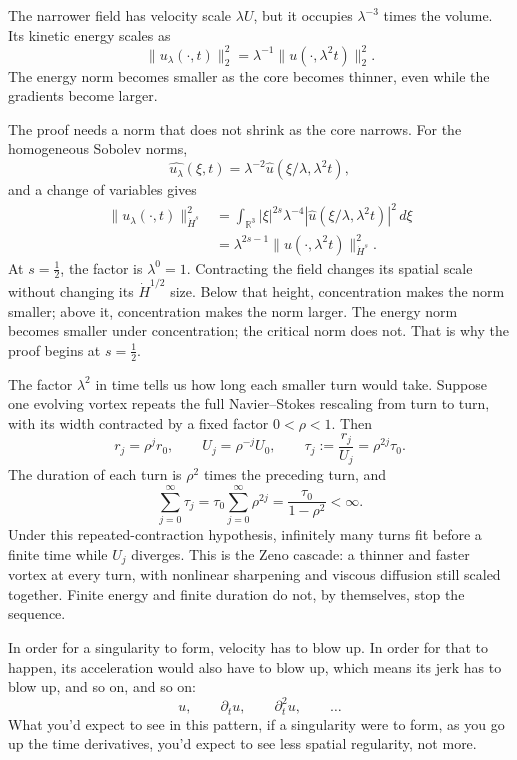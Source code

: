The narrower field has velocity scale \(\lambda U\), but it occupies
\(\lambda^{-3}\) times the volume. Its kinetic energy scales as
\[
\|u_\lambda(\cdot,t)\|_2^2
=\lambda^{-1}\|u(\cdot,\lambda^2t)\|_2^2.
\]
The energy norm becomes smaller as the core becomes thinner, even while the
gradients become larger.

\begin{minipage}{\textwidth}
The proof needs a norm that does not shrink as the core narrows. For the
homogeneous Sobolev norms,
\[
\widehat{u_\lambda}(\xi,t)
=\lambda^{-2}\widehat u(\xi/\lambda,\lambda^2t),
\]
and a change of variables gives
\[
\begin{aligned}
\|u_\lambda(\cdot,t)\|_{\dot H^s}^2
&=\int_{\mathbb R^3}|\xi|^{2s}\lambda^{-4}
  |\widehat u(\xi/\lambda,\lambda^2t)|^2\,d\xi\\
&=\lambda^{2s-1}
  \|u(\cdot,\lambda^2t)\|_{\dot H^s}^2.
\end{aligned}
\]
At \(s=\tfrac12\), the factor is \(\lambda^0=1\). Contracting the field changes
its spatial scale without changing its \(\dot H^{1/2}\) size. Below that
height, concentration makes the norm smaller; above it, concentration makes
the norm larger. The energy norm becomes smaller under concentration; the
critical norm does not. That is why the proof begins at \(s=\tfrac12\).
\end{minipage}

The factor \(\lambda^2\) in time tells us how long each smaller turn would
take. Suppose one evolving vortex repeats the full Navier--Stokes rescaling
from turn to turn, with its width contracted by a fixed factor
\(0<\rho<1\). Then
\[
r_j=\rho^jr_0,
\qquad
U_j=\rho^{-j}U_0,
\qquad
\tau_j:=\frac{r_j}{U_j}=\rho^{2j}\tau_0.
\]
The duration of each turn is \(\rho^2\) times the preceding turn, and
\[
\sum_{j=0}^{\infty}\tau_j
=\tau_0\sum_{j=0}^{\infty}\rho^{2j}
=\frac{\tau_0}{1-\rho^2}<\infty.
\]
Under this repeated-contraction hypothesis, infinitely many turns fit before
a finite time while \(U_j\) diverges. This is the Zeno cascade: a thinner and
faster vortex at every turn, with nonlinear sharpening and viscous diffusion
still scaled together. Finite energy and finite duration do not, by
themselves, stop the sequence.

In order for a singularity to form, velocity has to blow up. In order for
that to happen, its acceleration would also have to blow up, which means its
jerk has to blow up, and so on, and so on:
\[
u,\qquad \partial_tu,\qquad \partial_t^2u,\qquad \ldots
\]
What you'd expect to see in this pattern, if a singularity were to form, as
you go up the time derivatives, you'd expect to see less spatial regularity,
not more.

